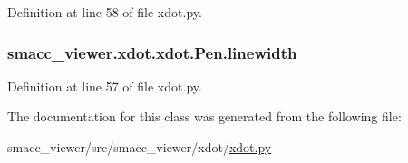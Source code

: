Definition at line 58 of file xdot.\+py.

\subsubsection[{\texorpdfstring{linewidth}{linewidth}}]{\setlength{\rightskip}{0pt plus 5cm}smacc\+\_\+viewer.\+xdot.\+xdot.\+Pen.\+linewidth}\hypertarget{classsmacc__viewer_1_1xdot_1_1xdot_1_1Pen_a7b3fef8a650a67d9a9fdb6f3351f0d91}{}\label{classsmacc__viewer_1_1xdot_1_1xdot_1_1Pen_a7b3fef8a650a67d9a9fdb6f3351f0d91}


Definition at line 57 of file xdot.\+py.



The documentation for this class was generated from the following file\+:\begin{DoxyCompactItemize}
\item 
smacc\+\_\+viewer/src/smacc\+\_\+viewer/xdot/\hyperlink{xdot_8py}{xdot.\+py}\end{DoxyCompactItemize}
